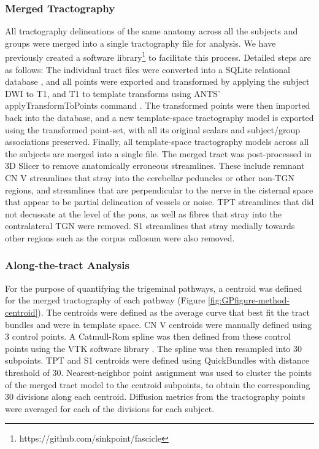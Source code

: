 \subsubsection{Merged Tractography}
All tractography delineations of the same anatomy across all the subjects and groups were merged into a single tractography file for analysis. We have previously created a software library\footnote{https://github.com/sinkpoint/fascicle} to facilitate this process. Detailed steps are as follows: The individual tract files were converted into a SQLite relational database \cite{owens2010sqlite}, and  all points were exported and transformed by applying the subject DWI to T1, and T1 to template transforms using ANTS' applyTransformToPoints command \cite{Avants2009}. The transformed points were then imported back into the  database, and a new template-space tractography model is exported using the transformed point-set, with all its original scalars and subject/group associations preserved. Finally, all template-space tractography models across all the subjects are merged into a single file. 
The merged tract was post-processed in 3D Slicer to remove anatomically erroneous streamlines. These include remnant CN V streamlines that stray into the cerebellar peduncles or other non-TGN regions, and streamlines that are perpendicular to the nerve in the cisternal space that appear to be partial delineation of vessels or noise. TPT streamlines that did not decussate at the level of the pons, as well as fibres that stray into the contralateral TGN were removed. S1 streamlines that stray medially towards other regions such as the corpus callosum were also removed.

\subsubsection{Along-the-tract Analysis}
For the purpose of quantifying the trigeminal pathways, a centroid was defined for the merged tractography of each pathway (Figure \ref{fig:GPfigure-method-centroid}). The centroids were defined as the average curve that best fit the tract bundles and were in template space. CN V centroids were manually defined using 3 control points. A Catmull-Rom spline \cite{DeRose1988} was then defined from these control points using the VTK software library \cite{Schroeder2005}. The spline was then resampled into 30 subpoints. TPT and S1 centroids were defined using QuickBundles \cite{Garyfallidis2012} with distance threshold of 30. Nearest-neighbor point assignment was used to cluster the points of the merged tract model to the centroid subpoints, to obtain the corresponding 30 divisions along each centroid. Diffusion metrics from the tractography points were averaged for each of the divisions for each subject. 

